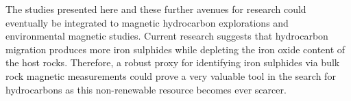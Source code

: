The studies presented here and these further avenues for research could eventually be integrated to magnetic hydrocarbon explorations and environmental magnetic studies. Current research suggests that hydrocarbon migration produces more iron sulphides while depleting the iron oxide content of the host rocks. Therefore, a robust proxy for identifying iron sulphides via bulk rock magnetic measurements could prove a very valuable tool in the search for hydrocarbons as this non-renewable resource becomes ever scarcer.\par

%
%

